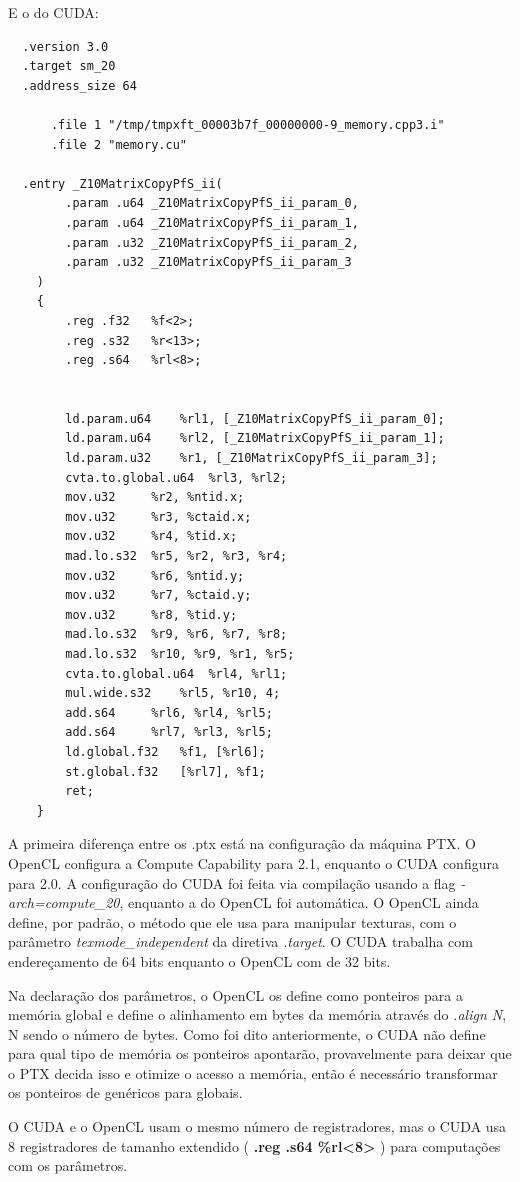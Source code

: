 E o do CUDA:

\begin{lstlisting}
  .version 3.0
  .target sm_20
  .address_size 64

	  .file	1 "/tmp/tmpxft_00003b7f_00000000-9_memory.cpp3.i"
	  .file	2 "memory.cu"

  .entry _Z10MatrixCopyPfS_ii(
	    .param .u64 _Z10MatrixCopyPfS_ii_param_0,
	    .param .u64 _Z10MatrixCopyPfS_ii_param_1,
	    .param .u32 _Z10MatrixCopyPfS_ii_param_2,
	    .param .u32 _Z10MatrixCopyPfS_ii_param_3
    )
    {
	    .reg .f32 	%f<2>;
	    .reg .s32 	%r<13>;
	    .reg .s64 	%rl<8>;


	    ld.param.u64 	%rl1, [_Z10MatrixCopyPfS_ii_param_0];
	    ld.param.u64 	%rl2, [_Z10MatrixCopyPfS_ii_param_1];
	    ld.param.u32 	%r1, [_Z10MatrixCopyPfS_ii_param_3];
	    cvta.to.global.u64 	%rl3, %rl2;
	    mov.u32 	%r2, %ntid.x;
	    mov.u32 	%r3, %ctaid.x;
	    mov.u32 	%r4, %tid.x;
	    mad.lo.s32 	%r5, %r2, %r3, %r4;
	    mov.u32 	%r6, %ntid.y;
	    mov.u32 	%r7, %ctaid.y;
	    mov.u32 	%r8, %tid.y;
	    mad.lo.s32 	%r9, %r6, %r7, %r8;
	    mad.lo.s32 	%r10, %r9, %r1, %r5;
	    cvta.to.global.u64 	%rl4, %rl1;
	    mul.wide.s32 	%rl5, %r10, 4;
	    add.s64 	%rl6, %rl4, %rl5;
	    add.s64 	%rl7, %rl3, %rl5;
	    ld.global.f32 	%f1, [%rl6];
	    st.global.f32 	[%rl7], %f1;
	    ret;
    }
\end{lstlisting}

A primeira diferença entre os .ptx está na configuração da máquina PTX. O OpenCL configura a Compute Capability para 2.1, enquanto
o CUDA configura para 2.0. A configuração do CUDA foi feita via compilação usando a flag \textit{-arch=compute\_20}, enquanto a do
OpenCL foi automática. O OpenCL ainda define, por padrão, o método que ele usa para manipular texturas, com o parâmetro 
\textit{texmode\_independent} da diretiva \textit{.target}. O CUDA trabalha com endereçamento de 64 bits enquanto o OpenCL com de
32 bits.

Na declaração dos parâmetros, o OpenCL os define como ponteiros para a memória global e define o alinhamento em bytes da memória
através do \textit{.align N}, N sendo o número de bytes. Como foi dito anteriormente, o CUDA não define para qual tipo de memória
os ponteiros apontarão, provavelmente para deixar que o PTX decida isso e otimize o acesso a memória, então é necessário
transformar os ponteiros de genéricos para globais.

O CUDA e o OpenCL usam o mesmo número de registradores, mas o CUDA usa 8 registradores de tamanho extendido ( \textbf{.reg .s64 \%rl<8>} )
para computações com os parâmetros.

